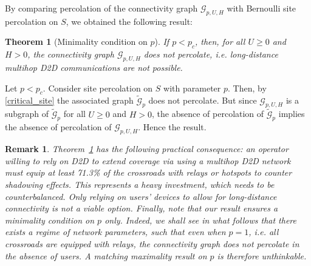 \documentclass[conference]{IEEEtran}
\newtheorem{theorem}{Theorem}
\newtheorem{remark}{Remark}
\begin{document}
\indent %
By comparing percolation of the connectivity graph $\mathcal{G}_{p,U,H}$ with Bernoulli site percolation on $S$, we obtained the following result: \\
\begin{theorem}[Minimality condition on $p$] \label{minimality_theorem} If %
$p<p_c$, then, for all $U \geq 0$ and $H>0$, the connectivity graph $\mathcal{G}_{p,U,H}$ does not percolate, i.e. long-distance multihop D2D communications are not possible.
\end{theorem}
\begin{IEEEproof} 
Let $p < p_c$.
Consider site percolation on $S$ with parameter $p$. Then, by \eqref{critical_site} the associated graph $\tilde{\mathcal{G}}_{p}$ does not percolate. But since $\mathcal{G}_{p,U,H}$ is a subgraph of $\tilde{\mathcal{G}}_{p}$ for all $U \geq 0$ and $H>0$, the absence of percolation of $\tilde{\mathcal{G}}_{p}$ implies the absence of percolation of $\mathcal{G}_{p,U,H}$. Hence the result.
\end{IEEEproof}
\vspace{\baselineskip}

\begin{remark}
Theorem~\ref{minimality_theorem} has the following practical consequence: an operator willing to rely on D2D to extend coverage via using a multihop D2D network must equip at least 71.3\% of the crossroads with relays or hotspots to counter shadowing effects. This represents a heavy investment, which needs to be counterbalanced. Only relying on users' devices to allow for long-distance connectivity is not a viable option. Finally, note that our result ensures a minimality condition on $p$ only. Indeed, we shall see in what follows that 
there exists a regime of network parameters, such that even when $p=1$, i.e. all crossroads are equipped with relays, the connectivity graph does not percolate in the absence of users. A matching maximality result on $p$ is therefore unthinkable.
\end{remark}
\end{document}
